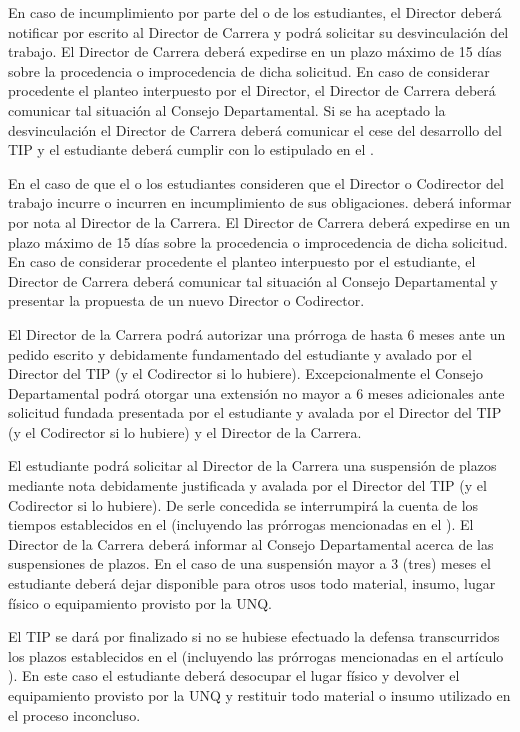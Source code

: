 
\articulo En caso de incumplimiento por parte del o de los estudiantes, el
Director deberá notificar por escrito al Director de Carrera y podrá solicitar su
desvinculación del trabajo. El Director de Carrera deberá expedirse en un plazo
máximo de 15 días sobre la procedencia o improcedencia de dicha solicitud. En caso
de considerar procedente el planteo interpuesto por el Director, el Director de Carrera
deberá comunicar tal situación al Consejo Departamental. Si se ha aceptado la
desvinculación el Director de Carrera deberá comunicar el cese del desarrollo del TIP
y el estudiante deberá cumplir con lo estipulado en el \artFinalizado.

\articulo En el caso de que el o los estudiantes consideren que el Director
o Codirector del trabajo incurre o incurren en incumplimiento de sus obligaciones.
deberá informar por nota al Director de la Carrera. El Director de Carrera deberá
expedirse en un plazo máximo de 15 días sobre la procedencia o improcedencia de
dicha solicitud. En caso de considerar procedente el planteo interpuesto por el
estudiante, el Director de Carrera deberá comunicar tal situación al Consejo
Departamental y presentar la propuesta de un nuevo Director o Codirector. 

\articulo {} El Director de la Carrera podrá autorizar una
prórroga de hasta 6 meses ante un pedido escrito y debidamente fundamentado del estudiante y avalado
por el Director del TIP (y el Codirector si lo hubiere). Excepcionalmente el Consejo
Departamental podrá otorgar una extensión no mayor a 6 meses adicionales ante
solicitud fundada presentada por el estudiante y avalada por el Director del TIP (y el
Codirector si lo hubiere) y el Director de la Carrera. 

\articulo El estudiante podrá solicitar al Director de la Carrera una
suspensión de plazos mediante nota debidamente justificada y avalada por el Director
del TIP (y el Codirector si lo hubiere). De serle concedida se interrumpirá la cuenta de
los tiempos establecidos en el \artTiempo{} (incluyendo las prórrogas mencionadas
en el \artProrrogas{}). El Director de la Carrera deberá informar al Consejo
Departamental acerca de las suspensiones de plazos. En el caso de una suspensión mayor a 3 (tres)
meses el estudiante deberá dejar disponible para otros usos todo material, insumo,
lugar físico o equipamiento provisto por la UNQ.

\articulo {} El TIP se dará por finalizado si no se hubiese
efectuado la defensa transcurridos los plazos establecidos en el \artTiempo{}
(incluyendo las prórrogas mencionadas en el artículo \artProrrogas{}). En este
caso el estudiante deberá desocupar el lugar físico y devolver el equipamiento provisto por la UNQ y restituir todo material o insumo
utilizado en el proceso inconcluso.

